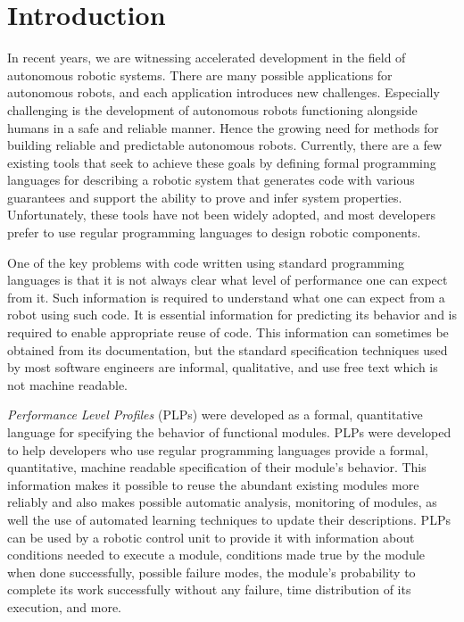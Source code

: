 \chapter{Introduction}
In recent years, we are witnessing accelerated development in the field of autonomous robotic systems. There are many possible applications for autonomous robots, and each application introduces new challenges. Especially challenging is the development of autonomous robots functioning alongside humans in a safe and reliable manner. Hence the growing need for methods for building reliable and predictable autonomous robots. Currently, there are a few existing tools \cite{basu2008incremental} that seek to achieve these goals by defining formal programming languages for describing a robotic system that generates code with various guarantees and support the ability to prove and infer system properties. Unfortunately, these tools have not been widely adopted, and most developers prefer to use regular programming languages to design robotic components.
\par One of the key problems with code written using standard programming languages is that it is not always clear what level of performance one can expect from it. Such information is required to understand what one can expect from a robot using such code. It is essential information for predicting its behavior and is required to enable appropriate reuse of code. This information can sometimes be obtained from its documentation, but the standard specification techniques used by most software engineers are informal, qualitative, and use free text which is not machine readable. 
\par \textit{Performance Level Profiles} (PLPs) \cite{brafman2014performance} \cite{brafman2016performance} were developed as a formal, quantitative language for specifying the behavior of functional modules. PLPs were developed to help developers who use regular programming languages provide a formal, quantitative, machine readable specification of their module’s behavior. This information makes it possible to reuse the abundant existing modules more reliably and also makes possible automatic analysis, monitoring of modules, as well the use of automated learning techniques to update their descriptions. PLPs can be used by a robotic control unit to provide it with information about conditions needed to execute a module, conditions made true by the module when done successfully, possible failure modes, the module’s probability to complete its work successfully without any failure, time distribution of its execution, and more.

